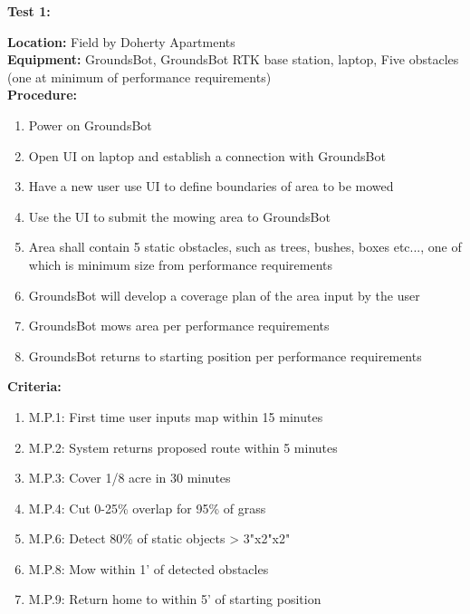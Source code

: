 \documentclass[12pt]{extarticle}
\begin{document}
\begin{center}
 \textbf{Test 1: }
\end{center}
\textbf{Location:} Field by Doherty Apartments\\
\textbf{Equipment:} GroundsBot, GroundsBot RTK base station, laptop, Five obstacles (one at minimum of performance requirements)\\
\textbf{Procedure:}
\begin{enumerate}
\item Power on GroundsBot

\item Open UI on laptop and establish a connection with GroundsBot

\item  Have a new user use UI to define boundaries of area to be mowed

\item  Use the UI to submit the mowing area to GroundsBot

\item  Area shall contain 5 static obstacles, such as trees, bushes, boxes etc..., one of which is minimum size from performance requirements

\item  GroundsBot will develop a coverage plan of the area input by the user

\item  GroundsBot mows area per performance requirements

\item  GroundsBot returns to starting position per performance requirements
\end{enumerate}

\noindent
\textbf{Criteria:}

\begin{enumerate}
\item M.P.1: First time user inputs map within 15 minutes
\item M.P.2: System returns proposed route within 5 minutes
\item M.P.3: Cover 1/8 acre in 30 minutes
\item M.P.4: Cut 0-25\% overlap for 95\% of grass
\item M.P.6: Detect 80\% of static objects > 3"x2"x2"
\item M.P.8: Mow within 1' of detected obstacles
\item M.P.9: Return home to within 5' of starting position
\end{enumerate}
\end{document}
